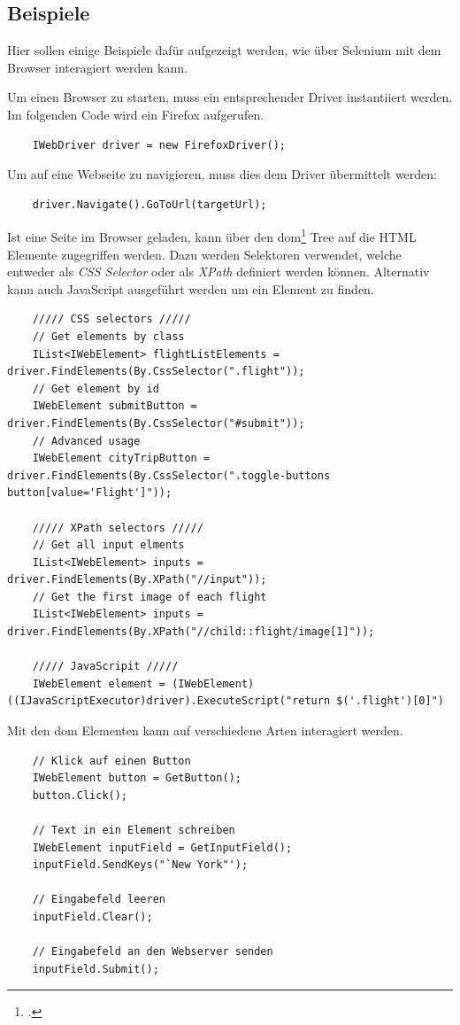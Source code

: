 \subsection{Beispiele}
Hier sollen einige Beispiele dafür aufgezeigt werden, wie über Selenium mit dem Browser interagiert werden kann.

Um einen Browser zu starten, muss ein entsprechender Driver instantiiert werden. Im folgenden Code wird ein Firefox aufgerufen.
\lstset{language=csh}
\begin{lstlisting}
	IWebDriver driver = new FirefoxDriver();
\end{lstlisting}

Um auf eine Webseite zu navigieren, muss dies dem Driver übermittelt werden:
\begin{lstlisting}
	driver.Navigate().GoToUrl(targetUrl);
\end{lstlisting}

Ist eine Seite im Browser geladen, kann über den \gls{dom}\footcite{Document_Object_Model} Tree auf die HTML Elemente zugegriffen werden. Dazu werden Selektoren verwendet, welche entweder als \textit{CSS Selector} oder als \textit{XPath} definiert werden können. Alternativ kann auch JavaScript ausgeführt werden um ein Element zu finden.
\begin{lstlisting}
	///// CSS selectors /////
	// Get elements by class
	IList<IWebElement> flightListElements = driver.FindElements(By.CssSelector(".flight"));
	// Get element by id 
	IWebElement submitButton = driver.FindElements(By.CssSelector("#submit")); 
	// Advanced usage
	IWebElement cityTripButton = driver.FindElements(By.CssSelector(".toggle-buttons button[value='Flight']")); 
	
	///// XPath selectors /////
	// Get all input elments
	IList<IWebElement> inputs = driver.FindElements(By.XPath("//input")); 
	// Get the first image of each flight
	IList<IWebElement> inputs = driver.FindElements(By.XPath("//child::flight/image[1]")); 
	
	///// JavaScripit /////
	IWebElement element = (IWebElement) ((IJavaScriptExecutor)driver).ExecuteScript("return $('.flight')[0]")
\end{lstlisting}

Mit den \gls{dom} Elementen kann auf verschiedene Arten interagiert werden.

\begin{lstlisting}
	// Klick auf einen Button
	IWebElement button = GetButton();
	button.Click();
	
	// Text in ein Element schreiben
	IWebElement inputField = GetInputField();
	inputField.SendKeys("`New York"');
	
	// Eingabefeld leeren
	inputField.Clear();
	
	// Eingabefeld an den Webserver senden
	inputField.Submit();
\end{lstlisting}

